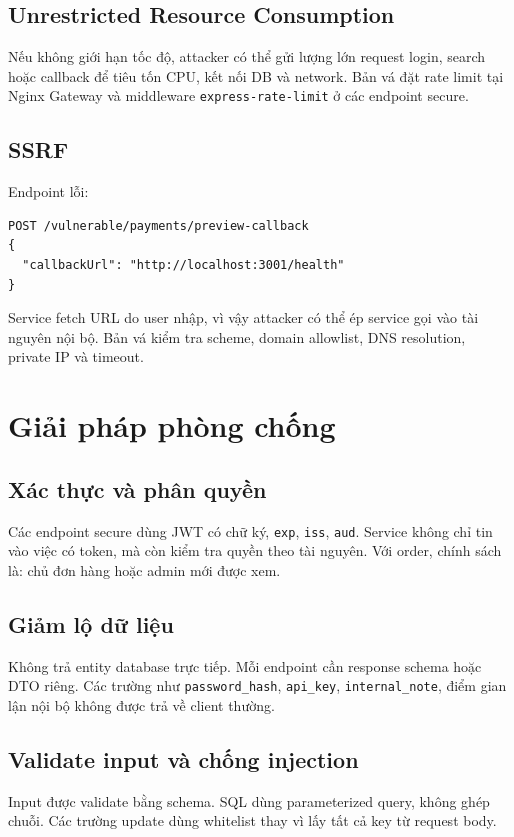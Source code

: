 \documentclass[12pt,a4paper]{report}
\begin{document}
\section{Unrestricted Resource Consumption}
Nếu không giới hạn tốc độ, attacker có thể gửi lượng lớn request login, search hoặc callback để tiêu tốn CPU, kết nối DB và network. Bản vá đặt rate limit tại Nginx Gateway và middleware \texttt{express-rate-limit} ở các endpoint secure.

\section{SSRF}
Endpoint lỗi:
\begin{lstlisting}
POST /vulnerable/payments/preview-callback
{
  "callbackUrl": "http://localhost:3001/health"
}
\end{lstlisting}
Service fetch URL do user nhập, vì vậy attacker có thể ép service gọi vào tài nguyên nội bộ. Bản vá kiểm tra scheme, domain allowlist, DNS resolution, private IP và timeout.

\chapter{Giải pháp phòng chống}

\section{Xác thực và phân quyền}
Các endpoint secure dùng JWT có chữ ký, \texttt{exp}, \texttt{iss}, \texttt{aud}. Service không chỉ tin vào việc có token, mà còn kiểm tra quyền theo tài nguyên. Với order, chính sách là: chủ đơn hàng hoặc admin mới được xem.

\section{Giảm lộ dữ liệu}
Không trả entity database trực tiếp. Mỗi endpoint cần response schema hoặc DTO riêng. Các trường như \texttt{password\_hash}, \texttt{api\_key}, \texttt{internal\_note}, điểm gian lận nội bộ không được trả về client thường.

\section{Validate input và chống injection}
Input được validate bằng schema. SQL dùng parameterized query, không ghép chuỗi. Các trường update dùng whitelist thay vì lấy tất cả key từ request body.
\end{document}
